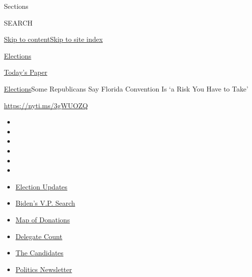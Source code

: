 Sections

SEARCH

\protect\hyperlink{site-content}{Skip to
content}\protect\hyperlink{site-index}{Skip to site index}

\href{https://www.nytimes.com/news-event/2020-election}{Elections}

\href{https://myaccount.nytimes.com/auth/login?response_type=cookie\&client_id=vi}{}

\href{https://www.nytimes.com/section/todayspaper}{Today's Paper}

\href{/news-event/2020-election}{Elections}\textbar{}Some Republicans
Say Florida Convention Is `a Risk You Have to Take'

\url{https://nyti.ms/3gWUOZQ}

\begin{itemize}
\item
\item
\item
\item
\item
\item
\end{itemize}

\begin{itemize}
\item
  \href{https://www.nytimes.com/2020/07/31/us/elections/biden-vs-trump.html?action=click\&pgtype=Article\&state=default\&region=TOP_BANNER\&context=storylines_menu}{Election
  Updates}
\item
  \href{https://www.nytimes.com/article/biden-vice-president-2020.html?action=click\&pgtype=Article\&state=default\&region=TOP_BANNER\&context=storylines_menu}{Biden's
  V.P. Search}
\item
  \href{https://www.nytimes.com/interactive/2020/07/24/us/politics/trump-biden-campaign-donors.html?action=click\&pgtype=Article\&state=default\&region=TOP_BANNER\&context=storylines_menu}{Map
  of Donations}
\item
  \href{https://www.nytimes.com/interactive/2020/us/elections/delegate-count-primary-results.html?action=click\&pgtype=Article\&state=default\&region=TOP_BANNER\&context=storylines_menu}{Delegate
  Count}
\item
  \href{https://www.nytimes.com/interactive/2019/us/politics/2020-presidential-candidates.html?action=click\&pgtype=Article\&state=default\&region=TOP_BANNER\&context=storylines_menu}{The
  Candidates}
\item
  \href{https://www.nytimes.com/newsletters/politics?action=click\&pgtype=Article\&state=default\&region=TOP_BANNER\&context=storylines_menu}{Politics
  Newsletter}
\end{itemize}

